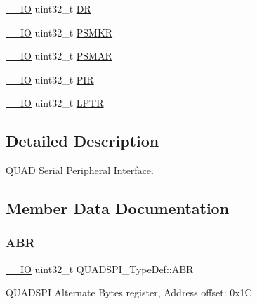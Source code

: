\begin{DoxyCompactItemize}
\item 
\mbox{\hyperlink{core__sc300_8h_aec43007d9998a0a0e01faede4133d6be}{\+\_\+\+\_\+\+IO}} uint32\+\_\+t \mbox{\hyperlink{struct_q_u_a_d_s_p_i___type_def_ae38590143dc85226183510790dda3475}{DR}}
\item 
\mbox{\hyperlink{core__sc300_8h_aec43007d9998a0a0e01faede4133d6be}{\+\_\+\+\_\+\+IO}} uint32\+\_\+t \mbox{\hyperlink{struct_q_u_a_d_s_p_i___type_def_a834e5dc7b51e2ab38570f6fcc6343b16}{P\+S\+M\+KR}}
\item 
\mbox{\hyperlink{core__sc300_8h_aec43007d9998a0a0e01faede4133d6be}{\+\_\+\+\_\+\+IO}} uint32\+\_\+t \mbox{\hyperlink{struct_q_u_a_d_s_p_i___type_def_a380877fcd114e30bba84898c139ca540}{P\+S\+M\+AR}}
\item 
\mbox{\hyperlink{core__sc300_8h_aec43007d9998a0a0e01faede4133d6be}{\+\_\+\+\_\+\+IO}} uint32\+\_\+t \mbox{\hyperlink{struct_q_u_a_d_s_p_i___type_def_a75e800640a43256743699e865edcea91}{P\+IR}}
\item 
\mbox{\hyperlink{core__sc300_8h_aec43007d9998a0a0e01faede4133d6be}{\+\_\+\+\_\+\+IO}} uint32\+\_\+t \mbox{\hyperlink{struct_q_u_a_d_s_p_i___type_def_aaa464abb172a98c828d889240bde0fc9}{L\+P\+TR}}
\end{DoxyCompactItemize}


\subsection{Detailed Description}
Q\+U\+AD Serial Peripheral Interface. 

\subsection{Member Data Documentation}
\mbox{\label{struct_q_u_a_d_s_p_i___type_def_af989aa29f188fdda929cd5f350ff27c5}} 
\subsubsection{\texorpdfstring{ABR}{ABR}}
{\footnotesize\ttfamily \mbox{\hyperlink{core__sc300_8h_aec43007d9998a0a0e01faede4133d6be}{\+\_\+\+\_\+\+IO}} uint32\+\_\+t Q\+U\+A\+D\+S\+P\+I\+\_\+\+Type\+Def\+::\+A\+BR}

Q\+U\+A\+D\+S\+PI Alternate Bytes register, Address offset\+: 0x1C \mbox{\label{struct_q_u_a_d_s_p_i___type_def_abf9f879cef8fff9883f1654f3cd14125}} 
